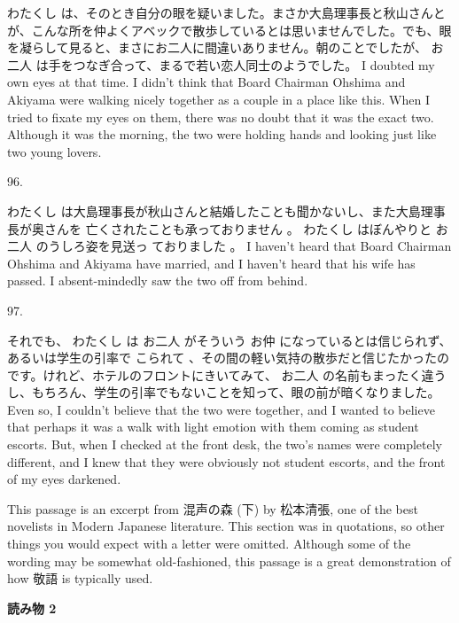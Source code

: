 \par{わたくし は、そのとき自分の眼を疑いました。まさか大島理事長と秋山さんとが、こんな所を仲よくアベックで散歩しているとは思いませんでした。でも、眼を凝らして見ると、まさにお二人に間違いありません。朝のことでしたが、 お二人 は手をつなぎ合って、まるで若い恋人同士のようでした。 \hfill\break
I doubted my own eyes at that time. I didn't think that Board Chairman Ohshima and Akiyama were walking nicely together as a couple in a place like this. When I tried to fixate my eyes on them, there was no doubt that it was the exact two. Although it was the morning, the two were holding hands and looking just like two young lovers. }

\par{96. }

\par{わたくし は大島理事長が秋山さんと結婚したことも聞かないし、また大島理事長が奥さんを 亡くされたことも承っておりません 。 わたくし はぼんやりと お二人 のうしろ姿を見送っ ておりました 。 \hfill\break
I haven't heard that Board Chairman Ohshima and Akiyama have married, and I haven't heard that his wife has passed. I absent-mindedly saw the two off from behind. }

\par{97. }

\par{それでも、 わたくし は お二人 がそういう お仲 になっているとは信じられず、あるいは学生の引率で こられて 、その間の軽い気持の散歩だと信じたかったのです。けれど、ホテルのフロントにきいてみて、 お二人 の名前もまったく違うし、もちろん、学生の引率でもないことを知って、眼の前が暗くなりました。 \hfill\break
Even so, I couldn't believe that the two were together, and I wanted to believe that perhaps it was a walk with light emotion with them coming as student escorts. But, when I checked at the front desk, the two's names were completely different, and I knew that they were obviously not student escorts, and the front of my eyes darkened. }

\par{ This passage is an excerpt from 混声の森 (下) by 松本清張, one of the best novelists in Modern Japanese literature. This section was in quotations, so other things you would expect with a letter were omitted. Although some of the wording may be somewhat old-fashioned, this passage is a great demonstration of how 敬語 is typically used. }

\begin{center}
\textbf{読み物 2 } 
\end{center}

